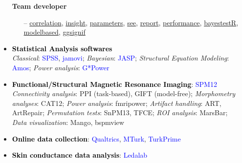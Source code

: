 \documentclass[10pt]{article}
\begin{document}
\begin{itemize}
\begin{itemize}
	\end{itemize}
	
	 \textbf{Team developer}
	 \vspace*{-0.09in}
	
	\begin{itemize}	 
	
		\item[--] \href{https://easystats.github.io/correlation/}{correlation}, \href{https://easystats.github.io/insight/}{insight}, \href{https://easystats.github.io/parameters/}{parameters}, \href{https://easystats.github.io/see/}{see}, \href{https://easystats.github.io/report/}{report}, \href{https://easystats.github.io/performance/}{performance}, \href{https://easystats.github.io/bayestestR/}{bayestestR}, \href{https://easystats.github.io/modelbased/}{modelbased}, \href{https://const-ae.github.io/ggsignif/}{ggsignif}

	\end{itemize}

	\item \textcolor{black}{\textbf{Statistical Analysis softwares}}\\
	\textit{Classical}: \textcolor{blue}{SPSS}, \textcolor{blue}{jamovi}; \textit{Bayesian}: \textcolor{blue}{JASP}; \textit{Structural Equation Modeling}: \textcolor{blue}{Amos}; \textit{Power analysis}: \textcolor{blue}{G*Power}
	
	
	\item \textcolor{black}{\textbf{Functional/Structural Magnetic Resonance Imaging}}: \textcolor{blue}{SPM12}\\
	\textit{Connectivity analysis}: PPI (task-based), GIFT (model-free); \textit{Morphometry analyses}: CAT12; \textit{Power analysis}: fmripower; \textit{Artifact handling}: ART, ArtRepair; \textit{Permutation tests}: SnPM13, TFCE; \textit{ROI analysis}: MarsBar;\\ 
	\textit{Data visualization}: Mango, bspmview
	
	
	\item \textcolor{black}{\textbf{Online data collection}}: \textcolor{blue}{Qualtrics}, \textcolor{blue}{MTurk}, \textcolor{blue}{TurkPrime}
	
	
	\item \textcolor{black}{\textbf{Skin conductance data analysis}}: \textcolor{blue}{Ledalab}

    \end{itemize}

	
\end{document}
